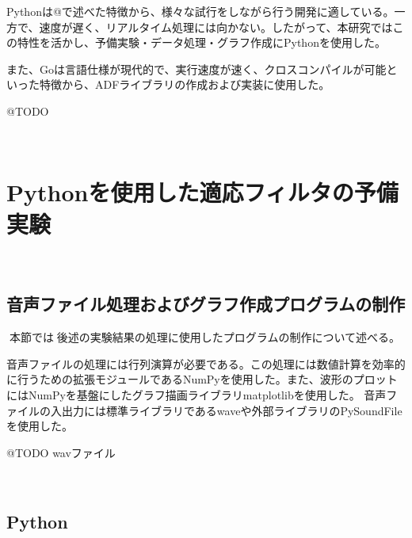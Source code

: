 Pythonは@で述べた特徴から、様々な試行をしながら行う開発に適している。一方で、速度が遅く、リアルタイム処理には向かない。したがって、本研究ではこの特性を活かし、予備実験・データ処理・グラフ作成にPythonを使用した。

また、Goは言語仕様が現代的で、実行速度が速く、クロスコンパイルが可能といった特徴から、ADFライブラリの作成および実装に使用した。

@TODO

\
\section{Pythonを使用した適応フィルタの予備実験}\label{pythonux3092ux4f7fux7528ux3057ux305fux9069ux5fdcux30d5ux30a3ux30ebux30bfux306eux4e88ux5099ux5b9fux9a13}

\
\subsection{音声ファイル処理およびグラフ作成プログラムの制作}\label{ux97f3ux58f0ux30d5ux30a1ux30a4ux30ebux51e6ux7406ux304aux3088ux3073ux30b0ux30e9ux30d5ux4f5cux6210ux30d7ux30edux30b0ux30e9ux30e0ux306eux5236ux4f5c}

本節では後述の実験結果の処理に使用したプログラムの制作について述べる。

音声ファイルの処理には行列演算が必要である。この処理には数値計算を効率的に行うための拡張モジュールであるNumPyを使用した。また、波形のプロットにはNumPyを基盤にしたグラフ描画ライブラリmatplotlibを使用した。
音声ファイルの入出力には標準ライブラリであるwaveや外部ライブラリのPySoundFileを使用した。

@TODO wavファイル

\
\subsection{Python}\label{python}

